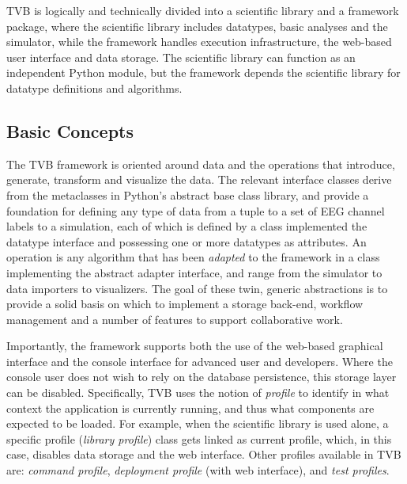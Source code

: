 TVB is logically and technically divided into a scientific
library and a framework package, where the scientific library includes
datatypes, basic analyses and the simulator, while the
framework handles execution infrastructure, the web-based user interface and
data storage.  The scientific library can function as an independent Python
module, but the framework depends the scientific library for datatype definitions
and algorithms. 

\subsection{Basic Concepts}

The TVB framework is oriented around data and the operations that introduce,
generate, transform and visualize the data. The relevant interface classes
derive from the metaclasses in Python's abstract base class library, and
provide a foundation for defining any type of data from a tuple to a
set of EEG channel labels to a simulation, each of which is defined by a class
implemented the datatype interface and possessing one or more datatypes as 
attributes. An operation is any algorithm that
has been \emph{adapted} to the framework in a class implementing the abstract
adapter interface, and range from the simulator to data importers to
visualizers.  The goal of these twin, generic abstractions is to provide a
solid basis on which to implement a storage back-end, workflow management and a
number of features to support collaborative work. 

Importantly, the framework supports both the use of the web-based graphical
interface and the console interface for advanced user and developers. Where
the console user does not wish to rely on the database persistence, this 
storage layer can be disabled. Specifically, TVB uses the notion of \emph{profile} to 
identify in what context the application is currently running,
and thus what components are expected to be loaded.
For example, when the scientific library is used alone, a specific profile (\emph{library profile}) class 
gets linked as current profile, which, in this case, disables data storage and the web interface. Other profiles available
in TVB are: \emph{command profile}, \emph{deployment profile} (with web interface), and \emph{test profiles}.


